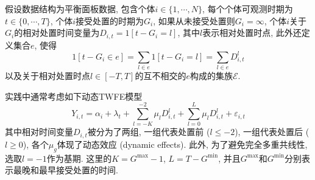 \documentclass[cn,blue,14pt,screen,bibstyle=gb7714-2015]{elegantnote}
\begin{document}
假设数据结构为平衡面板数据, 包含个体$i\in\{1,\cdots,N\}$, 每个个体可观测时期为$t\in\{0,\cdots,T\}$, 个体$i$接受处置的时期为$G_i$, 如果从未接受处置则$G_i=\infty$, 个体$i$关于$G_i$的相对处置时间变量为$D_{i,t}=1[t-G_i=l]$, 其中$l$表示相对处置时点, 此外还定义集合$e$, 使得
$$1[t-G_i\in e]=\sum_{l\in e}1[t-G_i=l]=\sum_{l\in e}D_{i,t}^l$$
以及关于相对处置时点$l\in [-T,T]$的互不相交的$e$构成的集族$\mathcal{E}$.

实践中通常考虑如下动态TWFE模型
$$Y_{i,t}=\alpha_i+\lambda_t+\sum_{l=-K}^{-2}\mu_lD_{i,t}^l+\sum_{l=0}^{L}\mu_lD_{i,t}^l+\varepsilon_{i,t}$$
其中相对时间变量$D_{i,t}$被分为了两组, 一组代表处置前 ($l\leq-2$), 一组代表处置后 ($l\ge0$), 各个$\mu_g$体现了动态效应 (dynamic effects). 此外, 为了避免完全多重共线性, 选取$l=-1$作为基期. 这里的$K=G^{\max}-1$, $L=T-G^{\min}$, 并且$G^{\max}$和$G^{\min}$分别表示最晚和最早接受处置的时间.
\end{document}
